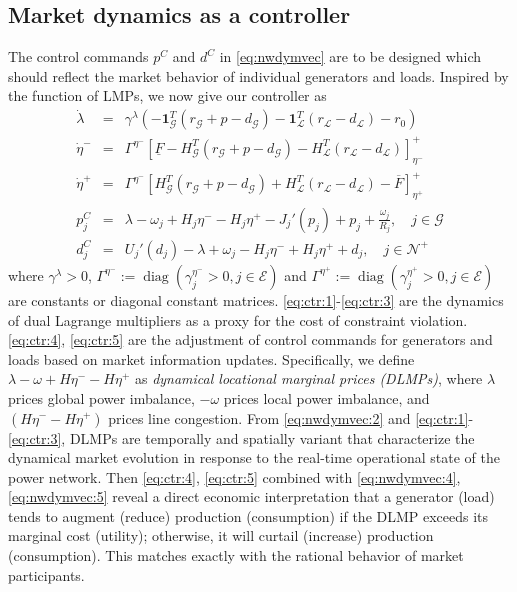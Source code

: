 \documentclass[journal,12pt,onecolumn,draftclsnofoot]{IEEEtran}
\newcommand{\diag}{\mathop{\mathrm{diag}}}
\begin{document}
\subsection{Market dynamics as a controller}

The control commands $p^C$ and $d^C$ in \eqref{eq:nwdymvec} are to be designed which should reflect the market behavior of individual generators and loads. Inspired by the function of LMPs, we now give our controller as 
\begin{subequations}
	\begin{eqnarray}
	\label{eq:ctr:1}
	\dot \lambda & = & \gamma^\lambda \left( - \mathbf 1^T_\mathcal{G} (r_\mathcal{G}+p-d_\mathcal{G})  - \mathbf 1^T_\mathcal{L} (r_\mathcal{L}-d_\mathcal{L}) -r_0 \right) \\
	\label{eq:ctr:2}
	\dot \eta^- & = & \Gamma^{\eta^-} \left[\underline{F} - H^T_{\mathcal{G}}(r_\mathcal{G}+p-d_\mathcal{G}) - H^T_\mathcal{L}(r_\mathcal{L}-d_\mathcal{L})  \right]^+_{\eta^-}   \\
	\label{eq:ctr:3}
	\dot \eta^+ & = & \Gamma^{\eta^-} \left[ H^T_{\mathcal{G}}(r_\mathcal{G}+p-d_\mathcal{G}) + H^T_\mathcal{L}(r_\mathcal{L}-d_\mathcal{L}) - \overline{F}  \right]^+_{\eta^+}   \\	
	\label{eq:ctr:4}
	 p_j^C  & =&	   \lambda -  \omega_j   +  H_j \eta^- - H_j \eta^+ - J_j'(p_j)    + p_j+\frac{\omega_j }{R_j}  ,\quad j\in\mathcal{G}  \\
	\label{eq:ctr:5}
	 d_j^C & = & U_j'(d_j) -  \lambda +  \omega_j - H_j \eta^- +  H_j\eta^+        + d_j, \quad  j\in\mathcal{N}^+
	\end{eqnarray}\label{eq:ctr}%
\end{subequations}
where $\gamma^\lambda> 0$, $ \Gamma^{\eta^{-}}:=\diag(\gamma_j^{\eta^-}> 0, j\in\mathcal{E})$ and $ \Gamma^{\eta^{+}}:=\diag(\gamma_j^{\eta^+}> 0, j\in\mathcal{E})$ are constants or diagonal constant matrices. \eqref{eq:ctr:1}-\eqref{eq:ctr:3} are the dynamics of dual Lagrange multipliers as a proxy for the cost of constraint violation. \eqref{eq:ctr:4}, \eqref{eq:ctr:5} are the adjustment of control commands for generators and loads based on market information updates. Specifically, we define $\lambda - \omega +H \eta^- - H\eta^+$ as \emph{dynamical locational marginal prices (DLMPs)}, where $\lambda$ prices global power imbalance, $-\omega$ prices local power imbalance, and $(H \eta^- - H\eta^+)$ prices line congestion. From \eqref{eq:nwdymvec:2} and \eqref{eq:ctr:1}-\eqref{eq:ctr:3}, DLMPs are temporally and spatially variant that characterize the dynamical market evolution in response to the real-time operational state of the power network. Then \eqref{eq:ctr:4}, \eqref{eq:ctr:5} combined with \eqref{eq:nwdymvec:4}, \eqref{eq:nwdymvec:5} reveal a direct economic interpretation that a generator (load) tends to augment (reduce) production (consumption) if the DLMP exceeds its marginal cost (utility); otherwise, it will curtail (increase) production (consumption). This matches exactly with the rational behavior of market participants.  
\end{document}
